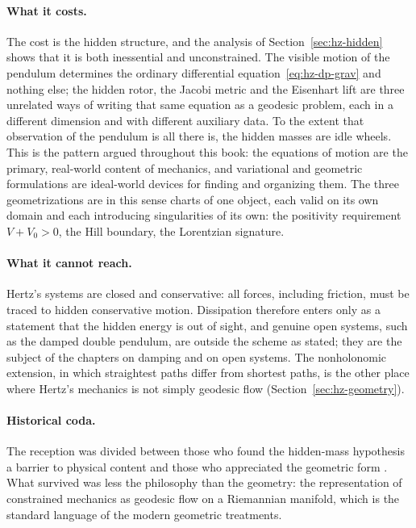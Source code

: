 \paragraph{What it costs.}
The cost is the hidden structure, and the analysis of Section~\ref{sec:hz-hidden}
shows that it is both inessential and unconstrained. The visible motion
of the pendulum determines the ordinary differential equation~\eqref{eq:hz-dp-grav}
and nothing else; the hidden rotor, the Jacobi metric and the Eisenhart
lift are three unrelated ways of writing that same equation as a geodesic problem,
each in a different dimension and with different auxiliary data. To the extent
that observation of the pendulum is all there is, the hidden masses
are idle wheels. This is the pattern argued throughout this book: the equations
of motion are the primary, real-world content of mechanics, and variational and
geometric formulations are ideal-world devices for finding and organizing them.
The three geometrizations are in this sense charts of one object, each valid
on its own domain and each introducing singularities of its own: the positivity
requirement $V+V_0>0$, the Hill boundary, the Lorentzian signature.

\paragraph{What it cannot reach.}
Hertz's systems are closed and conservative: all forces, including friction,
must be traced to hidden conservative motion. Dissipation therefore enters
only as a statement that the hidden energy is out of sight, and genuine open
systems, such as the damped double pendulum, are outside the scheme as stated;
they are the subject of the chapters on damping and on open systems.
The nonholonomic extension, in which straightest paths differ from shortest
paths, is the other place where Hertz's mechanics is not simply geodesic flow
(Section~\ref{sec:hz-geometry}).

\paragraph{Historical coda.}
The reception was divided between those who found the hidden-mass hypothesis a
barrier to physical content and those who appreciated the geometric form
\cite{hdp:lutzen2005}. What survived was less the philosophy than the geometry:
the representation of constrained mechanics as geodesic flow on a Riemannian
manifold, which is the standard language of the modern geometric treatments.

